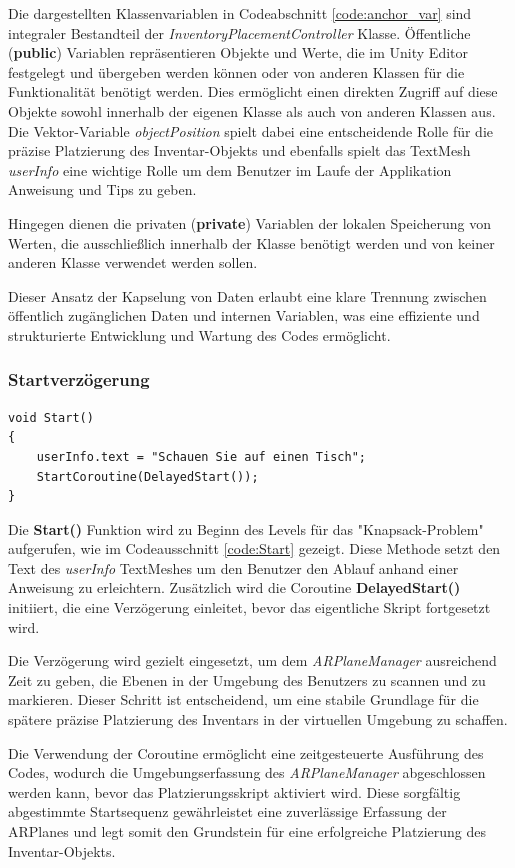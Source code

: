 Die dargestellten Klassenvariablen in Codeabschnitt \ref{code:anchor_var} sind integraler Bestandteil der
\textit{InventoryPlacementController} Klasse. Öffentliche (\textbf{public}) Variablen repräsentieren Objekte und Werte,
die im Unity Editor festgelegt und übergeben werden können oder von anderen Klassen für die Funktionalität benötigt werden.
Dies ermöglicht einen direkten Zugriff auf diese Objekte sowohl innerhalb der eigenen Klasse als auch von anderen Klassen
aus. Die Vektor-Variable \textit{objectPosition} spielt dabei eine entscheidende Rolle für die präzise Platzierung des
Inventar-Objekts und ebenfalls spielt das TextMesh \textit{userInfo} eine wichtige Rolle um dem Benutzer im Laufe der
Applikation Anweisung und Tips zu geben.

Hingegen dienen die privaten (\textbf{private}) Variablen der lokalen Speicherung von Werten, die ausschließlich innerhalb
der Klasse benötigt werden und von keiner anderen Klasse verwendet werden sollen.

Dieser Ansatz der Kapselung von Daten erlaubt eine klare Trennung zwischen öffentlich zugänglichen Daten und internen
Variablen, was eine effiziente und strukturierte Entwicklung und Wartung des Codes ermöglicht.
\subsubsection{Startverzögerung}
\begin{lstlisting}[style=csharp, caption={Beginn des Inventory Placement Controllers}, label=code:Start]
void Start()
{
    userInfo.text = "Schauen Sie auf einen Tisch";
    StartCoroutine(DelayedStart());
}
\end{lstlisting}
Die \textbf{Start()} Funktion wird zu Beginn des Levels für das "Knapsack-Problem" aufgerufen, wie im Codeausschnitt
\ref{code:Start} gezeigt. Diese Methode setzt den Text des \textit{userInfo} TextMeshes um den Benutzer den Ablauf anhand
einer Anweisung zu erleichtern. Zusätzlich wird die Coroutine \textbf{DelayedStart()} initiiert, die eine Verzögerung
einleitet, bevor das eigentliche Skript fortgesetzt wird.

Die Verzögerung wird gezielt eingesetzt, um dem \textit{ARPlaneManager} ausreichend Zeit zu geben, die Ebenen in der
Umgebung des Benutzers zu scannen und zu markieren. Dieser Schritt ist entscheidend, um eine stabile Grundlage für die
spätere präzise Platzierung des Inventars in der virtuellen Umgebung zu schaffen.

Die Verwendung der Coroutine ermöglicht eine zeitgesteuerte Ausführung des Codes, wodurch die Umgebungserfassung des
\textit{ARPlaneManager} abgeschlossen werden kann, bevor das Platzierungsskript aktiviert wird. Diese sorgfältig abgestimmte
Startsequenz gewährleistet eine zuverlässige Erfassung der ARPlanes und legt somit den Grundstein für eine erfolgreiche
Platzierung des Inventar-Objekts.\\

